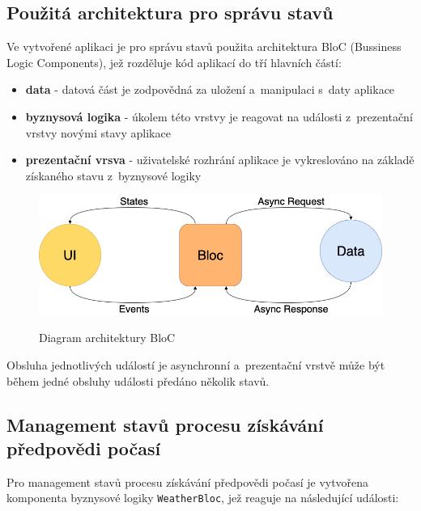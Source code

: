 \documentclass[12pt, a4paper]{article}
\begin{document}
\subsection{Použitá architektura pro správu stavů}

Ve vytvořené aplikaci je pro správu stavů použita architektura BloC (Bussiness Logic Components), jež rozděluje kód aplikací do tří hlavních částí:
\begin{itemize}
        \item \textbf{data} - datová část je zodpovědná za uložení a~manipulaci s~daty aplikace
        \item \textbf{byznysová logika} - úkolem této vrstvy je reagovat na události z~prezentační vrstvy novými stavy aplikace
        \item \textbf{prezentační vrsva} - uživatelské rozhrání aplikace je vykreslováno na základě získaného stavu z~byznysové logiky
\end{itemize}

\begin{figure}[!ht]
\centering
{\includegraphics[width=13.5cm]{img/bloc-architecture.png}}
\caption{Diagram architektury BloC}
\label{fig:vrp-recognition-diagram}
\end{figure}

Obsluha jednotlivých událostí je asynchronní a~prezentační vrstvě může být během jedné obsluhy události předáno několik stavů.


\subsection{Management stavů procesu získávání předpovědi počasí}

Pro management stavů procesu získávání předpovědi počasí je vytvořena komponenta byznysové logiky \texttt{WeatherBloc}, jež reaguje na následující události:
\end{document}
